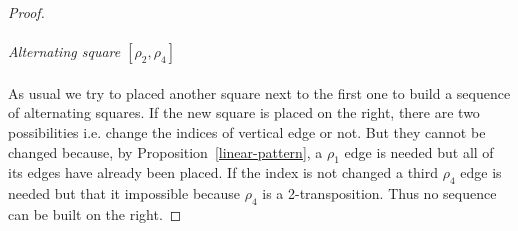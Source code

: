 \begin{proof}
\paragraph{}
\textit{Alternating square $[\rho_2,\rho_4]$}

\begin{figure}[H]
  \begin{center}
    \caption{}
  \end{center}
\end{figure}

\paragraph{}
As usual we try to placed another square next to the first one to build a sequence of alternating squares. If the new square is placed on the right, there are two possibilities i.e. change the indices of vertical edge or not. But they cannot be changed because, by Proposition~\ref{linear-pattern}, a $\rho_1$ edge is needed but all of its edges have already been placed. If the index is not changed a third $\rho_4$ edge is needed but that it impossible because $\rho_4$ is a 2-transposition. Thus no sequence can be built on the right.


\end{proof}
